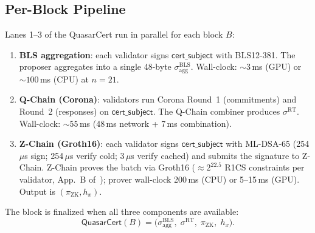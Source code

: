 \subsection{Per-Block Pipeline}
\label{sec:per-block}

Lanes 1--3 of the QuasarCert run in parallel for each block $B$:

\begin{enumerate}[nosep]
  \item \textbf{BLS aggregation}: each validator signs
    $\mathsf{cert\_subject}$ with BLS12-381. The proposer aggregates into
    a single 48-byte $\sigma^{\mathrm{BLS}}_{\mathrm{agg}}$.
    Wall-clock: ${\sim}3$\,ms (GPU) or ${\sim}100$\,ms (CPU) at
    $n{=}21$.
  \item \textbf{Q-Chain (Corona)}: validators run Corona Round~1
    (commitments) and Round~2 (responses) on
    $\mathsf{cert\_subject}$. The Q-Chain combiner produces
    $\sigma^{\mathrm{RT}}$. Wall-clock: ${\sim}55$\,ms (48\,ms network
    + 7\,ms combination).
  \item \textbf{Z-Chain (Groth16)}: each validator signs
    $\mathsf{cert\_subject}$ with ML-DSA-65 (254\,$\mu$s sign;
    254\,$\mu$s verify cold; 3\,$\mu$s verify cached) and submits the
    signature to Z-Chain. Z-Chain proves the batch via Groth16
    ($\approx 2^{22.5}$ R1CS constraints per validator, App.~B
    of~\cite{qcert-proof}); prover wall-clock 200\,ms (CPU) or 5--15\,ms
    (GPU). Output is $(\pi_{\mathrm{ZK}}, h_x)$.
\end{enumerate}

The block is finalized when all three components are available:
\[
\mathsf{QuasarCert}(B) =
\bigl(\sigma^{\mathrm{BLS}}_{\mathrm{agg}},\;
\sigma^{\mathrm{RT}},\;
\pi_{\mathrm{ZK}},\;
h_x\bigr).
\]


